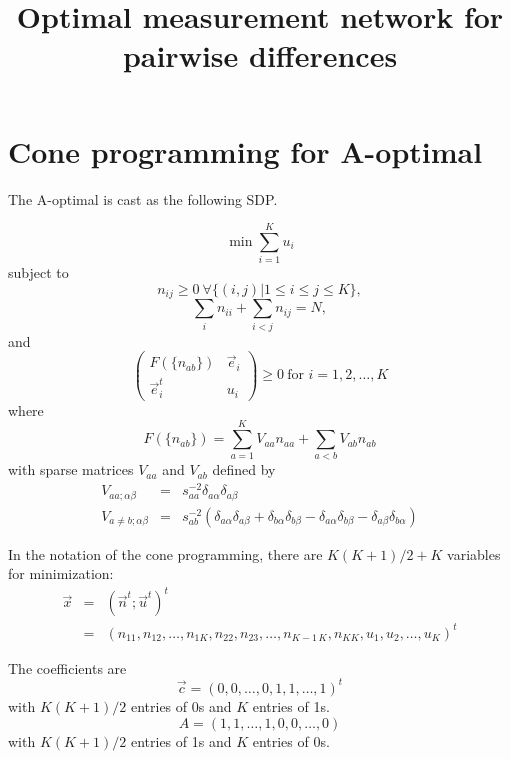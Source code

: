 \documentclass{article}
\begin{document}
\title{Optimal measurement network for pairwise differences}

\section{Cone programming for A-optimal}

The A-optimal is cast as the following SDP.

\begin{equation}
\min \sum_{i=1}^K u_i
\label{eq:SDP-objective}
\end{equation}
subject to
\begin{equation}
n_{ij} \geq 0  \ \forall \{ (i,j)|1 \leq i \leq j \leq K\},
\label{eq:SDP-positive-n}
\end{equation}
\begin{equation}
\sum_i n_{ii} + \sum_{i<j} n_{ij} = N,
\label{eq:SDP-sum-n}
\end{equation}
and
\begin{equation}
  \left(
\begin{array}{cc}
 F(\{n_{ab}\}) & \vec{e}_i \\
 \vec{e}_i^t & u_i
\end{array} \right) \geq 0  \ \text{for } i=1,2, \dots, K
\label{eq:SDP-Fu}
\end{equation}
where
\begin{equation}
F( \{n_{ab}\} ) = \sum_{a=1}^K V_{aa} n_{aa}
   + \sum_{a<b} V_{ab} n_{ab} 
\end{equation}
with sparse matrices $V_{aa}$ and $V_{ab}$ defined by
\begin{eqnarray}
V_{aa;\alpha\beta} &=& s_{aa}^{-2} \delta_{a\alpha}\delta_{a\beta}
\nonumber \\
V_{a\neq b;\alpha\beta} &=& s_{ab}^{-2} (\delta_{a\alpha}\delta_{a\beta} + \delta_{b\alpha}\delta_{b\beta} - \delta_{a\alpha}\delta_{b\beta} - \delta_{a\beta}\delta_{b\alpha}) 
\end{eqnarray}

In the notation of the cone programming, there are $K(K+1)/2 + K$ variables for 
minimization:
\begin{eqnarray}
  \vec{x} &=& ( \vec{n}^t; \vec{u}^t )^t
  \nonumber \\
    &=& ( n_{11}, n_{12}, \dots, n_{1K}, n_{22}, n_{23}, \dots, n_{K-1\, K}, n_{KK},
          u_1, u_2, \dots, u_K )^t
\end{eqnarray}

The coefficients are
\begin{equation}
\vec{c} = (0, 0, \dots, 0, 1, 1, \dots, 1 )^t
\end{equation}
with $K(K+1)/2$ entries of 0s and $K$ entries of 1s.
\begin{equation}
A = \left( 1, 1, \dots, 1, 0, 0, \dots, 0 \right)
\end{equation}
with $K(K+1)/2$ entries of 1s and $K$ entries of 0s.
\end{document}
